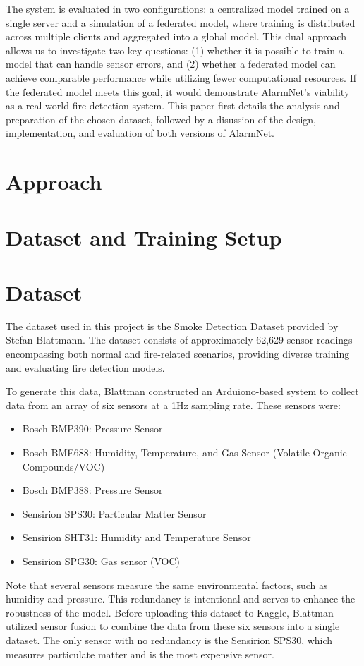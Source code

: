 \documentclass[conference]{IEEEtran}
\begin{document}
The system is evaluated in two configurations: a centralized
model trained on a single server and a simulation of a
federated model, where training is distributed across
multiple clients and aggregated into a global model. This
dual approach allows us to investigate two key questions:
(1) whether it is possible to train a model that can handle
sensor errors, and (2) whether a federated model can achieve
comparable performance while utilizing fewer computational
resources. If the federated model meets this goal, it would
demonstrate AlarmNet's viability as a real-world fire
detection system. This paper first details the analysis and
preparation of the chosen dataset, followed by a disussion
of the design, implementation, and evaluation of both
versions of AlarmNet.

\section{Approach}

\section{Dataset and Training Setup}
\section{Dataset}
The dataset used in this project is the Smoke Detection
Dataset provided by Stefan Blattmann\cite{dataset}. The
dataset consists of approximately 62,629 sensor readings
encompassing both normal and fire-related scenarios,
providing diverse training and evaluating fire detection
models.

To generate this data, Blattman constructed an
Arduiono-based system to collect data from an array of six
sensors at a 1Hz sampling rate. These sensors were:
\begin{itemize}
    \item Bosch BMP390: Pressure Sensor
    \item Bosch BME688: Humidity, Temperature, and Gas
    Sensor (Volatile Organic Compounds/VOC)
    \item Bosch BMP388: Pressure Sensor
    \item Sensirion SPS30: Particular Matter Sensor
    \item Sensirion SHT31: Humidity and Temperature Sensor
    \item Sensirion SPG30: Gas sensor (VOC)
\end{itemize}
Note that several sensors measure the same environmental
factors, such as humidity and pressure. This redundancy is
intentional and serves to enhance the robustness of the
model. Before uploading this dataset to Kaggle, Blattman
utilized sensor fusion to combine the data from these six
sensors into a single dataset. The only sensor with no
redundancy is the Sensirion SPS30, which measures
particulate matter and is the most expensive sensor.
\end{document}
